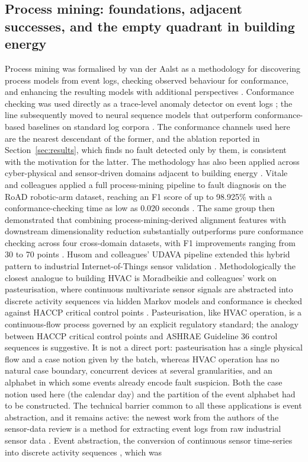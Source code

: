 \documentclass[11pt,letterpaper]{article}
\begin{document}
\subsection{Process mining: foundations, adjacent successes, and the empty quadrant in building energy}

Process mining was formalised by van der Aalst as a methodology for discovering process models from event logs, checking observed behaviour for conformance, and enhancing the resulting models with additional perspectives \cite{vanderaalst2012manifesto,vanderaalst2016processmining}. Conformance checking was used directly as a trace-level anomaly detector on event logs \cite{bezerra2013anomalytraces,rozinat2008conformance}; the line subsequently moved to neural sequence models that outperform conformance-based baselines on standard log corpora \cite{nolle2022binet}. The conformance channels used here are the nearest descendant of the former, and the ablation reported in Section~\ref{sec:results}, which finds no fault detected only by them, is consistent with the motivation for the latter. The methodology has also been applied across cyber-physical and sensor-driven domains adjacent to building energy \cite{myers2018pmics,singh2022pmselfhealing}. Vitale and colleagues applied a full process-mining pipeline to fault diagnosis on the RoAD robotic-arm dataset, reaching an F1 score of up to 98.925\% with a conformance-checking time as low as 0.020 seconds \cite{vitale2025roadcps}. The same group then demonstrated that combining process-mining-derived alignment features with downstream dimensionality reduction substantially outperforms pure conformance checking across four cross-domain datasets, with F1 improvements ranging from 30 to 70 points \cite{vitale2025kbsfeatures}. Husom and colleagues' UDAVA pipeline extended this hybrid pattern to industrial Internet-of-Things sensor validation \cite{husom2026udava}. Methodologically the closest analogue to building HVAC is Moradbeikie and colleagues' work on pasteurisation, where continuous multivariate sensor signals are abstracted into discrete activity sequences via hidden Markov models and conformance is checked against HACCP critical control points \cite{moradbeikie2025pasteurization}. Pasteurisation, like HVAC operation, is a continuous-flow process governed by an explicit regulatory standard; the analogy between HACCP critical control points and ASHRAE Guideline 36 control sequences is suggestive. It is not a direct port: pasteurisation has a single physical flow and a case notion given by the batch, whereas HVAC operation has no natural case boundary, concurrent devices at several granularities, and an alphabet in which some events already encode fault suspicion. Both the case notion used here (the calendar day) and the partition of the event alphabet had to be constructed. The technical barrier common to all these applications is event abstraction, and it remains active: the newest work from the authors of the sensor-data review is a method for extracting event logs from raw industrial sensor data \cite{brzychczy2025iotminer}. Event abstraction, the conversion of continuous sensor time-series into discrete activity sequences \cite{deluzi2025bpmiotreview,mangler2024iotbp}, which was 
\end{document}
